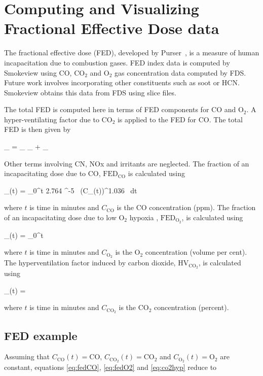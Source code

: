 \documentclass[11pt,twoside]{book}
\begin{document}
\section{Computing and Visualizing Fractional Effective Dose data}
The fractional effective dose (FED), developed by
Purser~\cite{SFPE:Purser}, is a measure of human incapacitation
due to combustion gases.  FED index data is computed by Smokeview
using CO, $\mathrm{CO_2}$ and $\mathrm{O_2}$ gas concentration
data computed by FDS. Future work involves incorporating other
constituents such as soot or HCN.  Smokeview obtains this data
from FDS using slice files.

The total FED is computed here in terms of FED components for CO
and $\mathrm{O_2}$.  A hyper-ventilating factor due to
$\mathrm{CO_2}$ is applied to the FED for CO. The total FED is
then given by

\be {}_ = _ \times
{}_ + _ \ee

Other terms involving CN, NOx and irritants are neglected. The
fraction of an incapacitating dose due to CO,
$\mathrm{FED}_\mathrm{CO}$ is calculated using

\be {}_(t) = \int_0^t 2.764 ^{-5} \,
(C_(t))^{1.036} \, dt \label{eq:fedCO} \ee

where $t$ is time in minutes and $C_\mathrm{CO}$ is the CO
concentration (ppm). The fraction of an incapacitating dose due to
low O${}_2$ hypoxia , $\mathrm{FED}_\mathrm{O_2}$, is calculated
using

\be {}_(t) =  \int_0^t 
\label{eq:fedO2} \ee

where $t$ is time in minutes and $C_\mathrm{O_2}$ is the O${}_2$
concentration (volume per cent). The hyperventilation factor
induced by carbon dioxide, $\mathrm{HV}_\mathrm{CO_2}$, is
calculated using

\be {}_(t) =  \label{eq:co2hyp} \ee

where $t$ is time in minutes and $C_\mathrm{CO_2}$ is the
$\mathrm{CO_2}$ concentration (percent).

\subsection{FED example}
Assuming that $C_\mathrm{CO}(t)=\mathrm{CO}$,
$C_\mathrm{CO_2}(t)=\mathrm{CO_2}$ and
$C_\mathrm{O_2}(t)=\mathrm{O_2}$ are constant, equations
\ref{eq:fedCO}, \ref{eq:fedO2} and \ref{eq:co2hyp} reduce to
\end{document}
